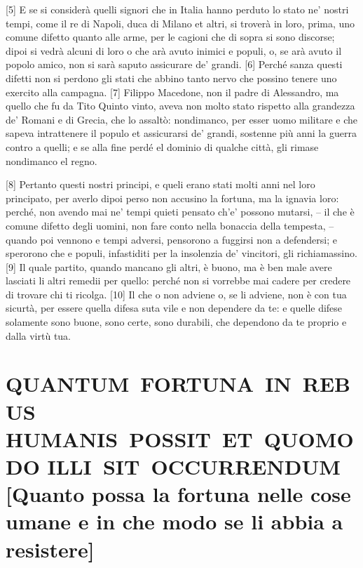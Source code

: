 {[}5{]} E se si considerà quelli signori che in Italia hanno perduto lo
stato ne' nostri tempi, come il re di Napoli, duca di Milano et altri,
si troverà in loro, prima, uno comune difetto quanto alle arme, per le
cagioni che di sopra si sono discorse; dipoi si vedrà alcuni di loro o
che arà avuto inimici e populi, o, se arà avuto il popolo amico, non si
sarà saputo assicurare de' grandi. {[}6{]} Perché sanza questi difetti
non si perdono gli stati che abbino tanto nervo che possino tenere uno
exercito alla campagna. {[}7{]} Filippo Macedone, non il padre di
Alessandro, ma quello che fu da Tito Quinto vinto, aveva non molto stato
rispetto alla grandezza de' Romani e di Grecia, che lo assaltò:
nondimanco, per esser uomo militare e che sapeva intrattenere il populo
et assicurarsi de' grandi, sostenne più anni la guerra contro a quelli;
e se alla fine perdé el dominio di qualche città, gli rimase nondimanco
el regno.

{[}8{]} Pertanto questi nostri principi, e queli erano stati molti anni
nel loro principato, per averlo dipoi perso non accusino la fortuna, ma
la ignavia loro: perché, non avendo mai ne' tempi quieti pensato ch'e'
possono mutarsi, -- il che è comune difetto degli uomini, non fare conto
nella bonaccia della tempesta, -- quando poi vennono e tempi adversi,
pensorono a fuggirsi non a defendersi; e sperorono che e populi,
infastiditi per la insolenzia de' vincitori, gli richiamassino. {[}9{]}
Il quale partito, quando mancano gli altri, è buono, ma è ben male avere
lasciati li altri remedii per quello: perché non si vorrebbe mai cadere
per credere di trovare chi ti ricolga. {[}10{]} Il che o non adviene o,
se li adviene, non è con tua sicurtà, per essere quella difesa suta vile
e non dependere da te: e quelle difese solamente sono buone, sono certe,
sono durabili, che dependono da te proprio e dalla virtù tua.

\quebra\section{QUANTUM~FORTUNA~IN~REBUS HUMANIS~POSSIT~ET~QUOMODO ILLI~SIT~OCCURRENDUM\break
{[}Quanto possa la fortuna nelle cose umane e in che modo se li abbia a resistere{]}}

